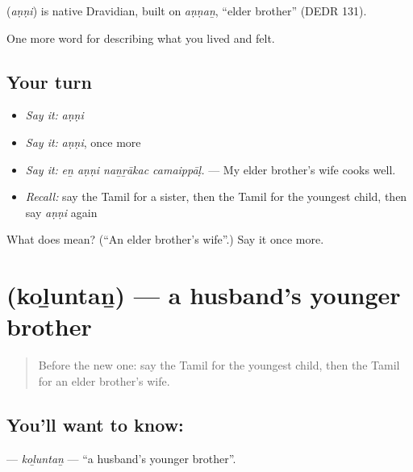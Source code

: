 \begin{cousinweb}
\textbf{} (\emph{aṇṇi}) is native Dravidian, built on  \emph{aṇṇaṉ}, \textquotedblleft{}elder brother\textquotedblright{} (DEDR 131).
\end{cousinweb}

\begin{grammarlens}[title={What you've built}]
One more word for describing what you lived and felt.
\end{grammarlens}

\subsection*{Your turn}
\begin{itemize}
\raggedright
  \item \emph{Say it:} \emph{aṇṇi}
  \item \emph{Say it:} \emph{aṇṇi}, once more
  \item \emph{Say it:} \emph{eṉ aṇṇi naṉṟākac camaippāḷ.} — My elder brother’s wife cooks well.
  \item \emph{Recall:} say the Tamil for a sister, then the Tamil for the youngest child, then say \emph{aṇṇi} again
\end{itemize}

\begin{tcolorbox}[breakable,colback=teal!4,colframe=teal!35!black,title={Before you move on}]
What does  mean? (\textquotedblleft{}An elder brother’s wife\textquotedblright{}.) Say it once more.
\end{tcolorbox}
\section[\texorpdfstring{\ta{கொழுந்தன்} (koḻuntaṉ)}{கொழுந்தன் (koḻuntaṉ)}]{ (koḻuntaṉ) — a husband’s younger brother}

\label{lesson:TA-C493-koluntan}



\begin{quote}
Before the new one: say the Tamil for the youngest child, then the Tamil for an elder brother’s wife.
\end{quote}

\subsection*{You'll want to know: }
\textbf{} — \emph{koḻuntaṉ} — \textquotedblleft{}a husband’s younger brother\textquotedblright{}.

